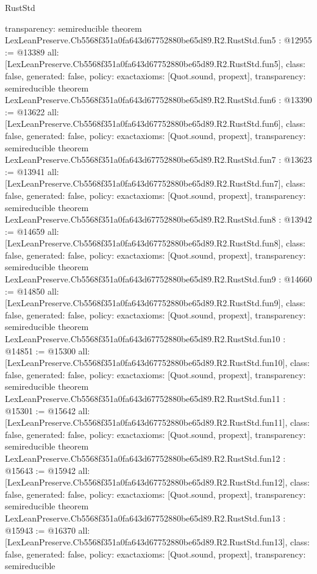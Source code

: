 \begin{lexlean}{RustStd}
\begin{coremodule}
{  transparency: semireducible
}
theorem LexLeanPreserve.Cb5568f351a0fa643d67752880be65d89.R2.RustStd.fun5 : @12955 := @13389 {
  all: [LexLeanPreserve.Cb5568f351a0fa643d67752880be65d89.R2.RustStd.fun5],
  class: false,
  generated: false,
  policy: exact{axioms: [Quot.sound, propext]},
  transparency: semireducible
}
theorem LexLeanPreserve.Cb5568f351a0fa643d67752880be65d89.R2.RustStd.fun6 : @13390 := @13622 {
  all: [LexLeanPreserve.Cb5568f351a0fa643d67752880be65d89.R2.RustStd.fun6],
  class: false,
  generated: false,
  policy: exact{axioms: [Quot.sound, propext]},
  transparency: semireducible
}
theorem LexLeanPreserve.Cb5568f351a0fa643d67752880be65d89.R2.RustStd.fun7 : @13623 := @13941 {
  all: [LexLeanPreserve.Cb5568f351a0fa643d67752880be65d89.R2.RustStd.fun7],
  class: false,
  generated: false,
  policy: exact{axioms: [Quot.sound, propext]},
  transparency: semireducible
}
theorem LexLeanPreserve.Cb5568f351a0fa643d67752880be65d89.R2.RustStd.fun8 : @13942 := @14659 {
  all: [LexLeanPreserve.Cb5568f351a0fa643d67752880be65d89.R2.RustStd.fun8],
  class: false,
  generated: false,
  policy: exact{axioms: [Quot.sound, propext]},
  transparency: semireducible
}
theorem LexLeanPreserve.Cb5568f351a0fa643d67752880be65d89.R2.RustStd.fun9 : @14660 := @14850 {
  all: [LexLeanPreserve.Cb5568f351a0fa643d67752880be65d89.R2.RustStd.fun9],
  class: false,
  generated: false,
  policy: exact{axioms: [Quot.sound, propext]},
  transparency: semireducible
}
theorem LexLeanPreserve.Cb5568f351a0fa643d67752880be65d89.R2.RustStd.fun10 : @14851 := @15300 {
  all: [LexLeanPreserve.Cb5568f351a0fa643d67752880be65d89.R2.RustStd.fun10],
  class: false,
  generated: false,
  policy: exact{axioms: [Quot.sound, propext]},
  transparency: semireducible
}
theorem LexLeanPreserve.Cb5568f351a0fa643d67752880be65d89.R2.RustStd.fun11 : @15301 := @15642 {
  all: [LexLeanPreserve.Cb5568f351a0fa643d67752880be65d89.R2.RustStd.fun11],
  class: false,
  generated: false,
  policy: exact{axioms: [Quot.sound, propext]},
  transparency: semireducible
}
theorem LexLeanPreserve.Cb5568f351a0fa643d67752880be65d89.R2.RustStd.fun12 : @15643 := @15942 {
  all: [LexLeanPreserve.Cb5568f351a0fa643d67752880be65d89.R2.RustStd.fun12],
  class: false,
  generated: false,
  policy: exact{axioms: [Quot.sound, propext]},
  transparency: semireducible
}
theorem LexLeanPreserve.Cb5568f351a0fa643d67752880be65d89.R2.RustStd.fun13 : @15943 := @16370 {
  all: [LexLeanPreserve.Cb5568f351a0fa643d67752880be65d89.R2.RustStd.fun13],
  class: false,
  generated: false,
  policy: exact{axioms: [Quot.sound, propext]},
  transparency: semireducible
}
\end{coremodule}
\end{lexlean}
